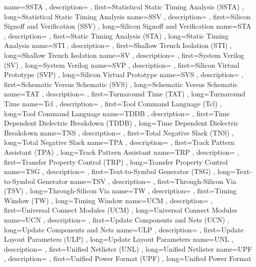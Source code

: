 { name={SSTA}
, description={}
, first={Statistical Static Timing Analysis (SSTA)}
, long={Statistical Static Timing Analysis}
}
{ name={SSV}
, description={}
, first={Silicon Signoff and Verification (SSV)}
, long={Silicon Signoff and Verification}
}
{ name={STA}
, description={}
, first={Static Timing Analysis (STA)}
, long={Static Timing Analysis}
}
{ name={STI}
, description={}
, first={Shallow Trench Isolation (STI)}
, long={Shallow Trench Isolation}
}
{ name={SV}
, description={}
, first={System Verilog (SV)}
, long={System Verilog}
}
{ name={SVP}
, description={}
, first={Silicon Virtual Prototype (SVP)}
, long={Silicon Virtual Prototype}
}
{ name={SVS}
, description={}
, first={Schematic Versus Schematic (SVS)}
, long={Schematic Versus Schematic}
}
{ name={TAT}
, description={}
, first={Turnaround Time (TAT)}
, long={Turnaround Time}
}
{ name={Tcl}
, description={}
, first={Tool Command Language (Tcl)}
, long={Tool Command Language}
}
{ name={TDDB}
, description={}
, first={Time Dependent Dielectric Breakdown (TDDB)}
, long={Time Dependent Dielectric Breakdown}
}
{ name={TNS}
, description={}
, first={Total Negative Slack (TNS)}
, long={Total Negative Slack}
}
{ name={TPA}
, description={}
, first={Track Pattern Assistant (TPA)}
, long={Track Pattern Assistant}
}
{ name={TRP}
, description={}
, first={Transfer Property Control (TRP)}
, long={Transfer Property Control}
}
{ name={TSG}
, description={}
, first={Text-to-Symbol Generator (TSG)}
, long={Text-to-Symbol Generator}
}
{ name={TSV}
, description={}
, first={Through-Silicon Via (TSV)}
, long={Through-Silicon Via}
}
{ name={TW}
, description={}
, first={Timing Window (TW)}
, long={Timing Window}
}
{ name={UCM}
, description={}
, first={Universal Connect Modules (UCM)}
, long={Universal Connect Modules}
}
{ name={UCN}
, description={}
, first={Update Components and Nets (UCN)}
, long={Update Components and Nets}
}
{ name={ULP}
, description={}
, first={Update Layout Parameters (ULP)}
, long={Update Layout Parameters}
}
{ name={UNL}
, description={}
, first={Unified Netlister (UNL)}
, long={Unified Netlister}
}
{ name={UPF}
, description={}
, first={Unified Power Format (UPF)}
, long={Unified Power Format}
}
